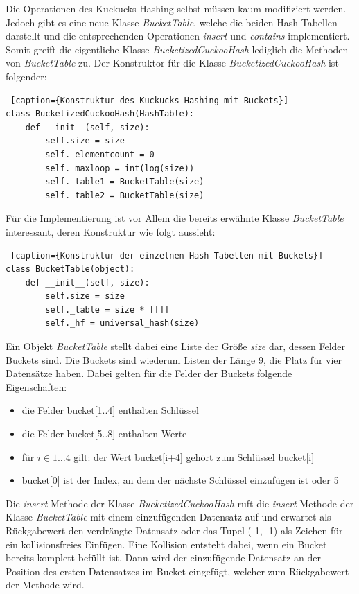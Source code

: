 Die Operationen des Kuckucks-Hashing selbst müssen kaum modifiziert werden. Jedoch gibt es eine neue Klasse \textit{BucketTable}, welche die beiden Hash-Tabellen darstellt und die entsprechenden Operationen \textit{insert} und \textit{contains} implementiert. Somit greift die eigentliche Klasse \textit{BucketizedCuckooHash} lediglich die Methoden von \textit{BucketTable} zu. Der Konstruktor für die Klasse \textit{BucketizedCuckooHash} ist folgender:
\begin{lstlisting} [caption={Konstruktur des Kuckucks-Hashing mit Buckets}]
class BucketizedCuckooHash(HashTable):
    def __init__(self, size):
        self.size = size
        self._elementcount = 0
        self._maxloop = int(log(size))
        self._table1 = BucketTable(size)
        self._table2 = BucketTable(size)                
\end{lstlisting}
Für die Implementierung ist vor Allem die bereits erwähnte Klasse \textit{BucketTable} interessant, deren Konstruktur wie folgt aussieht:
\begin{lstlisting} [caption={Konstruktur der einzelnen Hash-Tabellen mit Buckets}]
class BucketTable(object):
    def __init__(self, size):
        self.size = size
        self._table = size * [[]]
        self._hf = universal_hash(size)           
\end{lstlisting}
Ein Objekt \textit{BucketTable} stellt dabei eine Liste der Größe \textit{size} dar, dessen Felder Buckets sind. Die Buckets sind wiederum Listen der Länge 9, die Platz für vier Datensätze haben. Dabei gelten für die Felder der Buckets folgende Eigenschaften:
\begin{itemize}	
	\item die Felder bucket[1..4] enthalten Schlüssel
	\item die Felder bucket[5..8] enthalten Werte
	\item für \(i\in{1\dots{}4}\) gilt: der Wert bucket[i+4] gehört zum Schlüssel bucket[i]
	\item bucket[0] ist der Index, an dem der nächste Schlüssel einzufügen ist oder 5
\end{itemize}
Die \textit{insert}-Methode der Klasse \textit{BucketizedCuckooHash} ruft die \textit{insert}-Methode der Klasse \textit{BucketTable} mit einem einzufügenden Datensatz auf und erwartet als Rückgabewert den verdrängte Datensatz oder das Tupel (-1, -1) als Zeichen für ein kollisionsfreies Einfügen. Eine Kollision entsteht dabei, wenn ein Bucket bereits komplett befüllt ist. Dann wird der einzufügende Datensatz an der Position des ersten Datensatzes im Bucket eingefügt, welcher zum Rückgabewert der Methode wird. 

